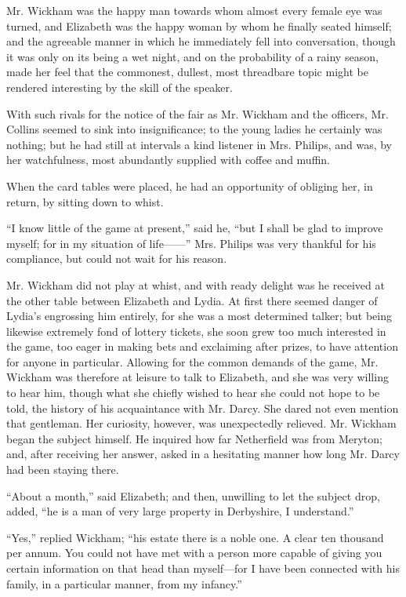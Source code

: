 Mr. Wickham was the happy man towards whom almost every female eye was turned, and Elizabeth was the happy woman by whom he finally seated himself; and the agreeable manner in which he immediately fell into conversation, though it was only on its being a wet night, and on the probability of a rainy season, made her feel that the commonest, dullest, most threadbare topic might be rendered interesting by the skill of the speaker.

With such rivals for the notice of the fair as Mr. Wickham and the officers, Mr. Collins seemed to sink into insignificance; to the young ladies he certainly was nothing; but he had still at intervals a kind listener in Mrs. Philips, and was, by her watchfulness, most abundantly supplied with coffee and muffin.

When the card tables were placed, he had an opportunity of obliging her, in return, by sitting down to whist.

``I know little of the game at present,'' said he, ``but I shall be glad to improve myself; for in my situation of life------'' Mrs. Philips was very thankful for his compliance, but could not wait for his reason.

Mr. Wickham did not play at whist, and with ready delight was he received at the other table between Elizabeth and Lydia. At first there seemed danger of Lydia's engrossing him entirely, for she was a most determined talker; but being likewise extremely fond of lottery tickets, she soon grew too much interested in the game, too eager in making bets and exclaiming after prizes, to have attention for anyone in particular. Allowing for the common demands of the game, Mr. Wickham was therefore at leisure to talk to Elizabeth, and she was very willing to hear him, though what she chiefly wished to hear she could not hope to be told, the history of his acquaintance with Mr. Darcy. She dared not even mention that gentleman. Her curiosity, however, was unexpectedly relieved. Mr. Wickham began the subject himself. He inquired how far Netherfield was from Meryton; and, after receiving her answer, asked in a hesitating manner how long Mr. Darcy had been staying there.

``About a month,'' said Elizabeth; and then, unwilling to let the subject drop, added, ``he is a man of very large property in Derbyshire, I understand.''

``Yes,'' replied Wickham; ``his estate there is a noble one. A clear ten thousand per annum. You could not have met with a person more capable of giving you certain information on that head than myself---for I have been connected with his family, in a particular manner, from my infancy.''

